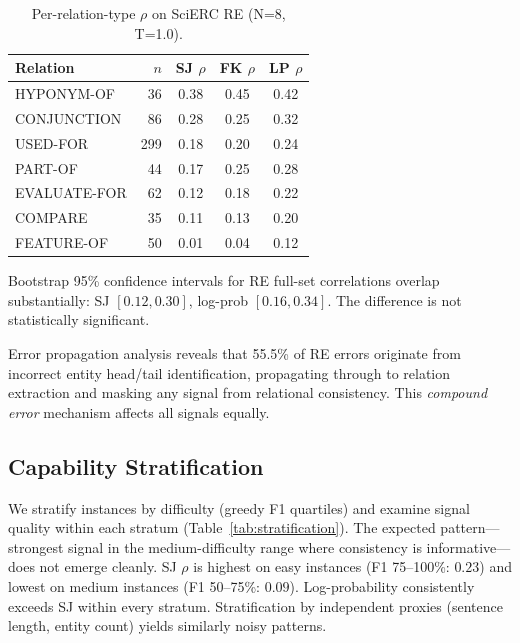 \documentclass[11pt,a4paper]{article}
\begin{document}
\begin{table}[t]
\centering
\small
\caption{Per-relation-type $\rho$ on SciERC RE (N=8, T=1.0).}
\label{tab:re_diagnostic}
\begin{tabular}{lrccc}
\toprule
Relation & $n$ & SJ $\rho$ & FK $\rho$ & LP $\rho$ \\
\midrule
HYPONYM-OF & 36 & 0.38 & 0.45 & 0.42 \\
CONJUNCTION & 86 & 0.28 & 0.25 & 0.32 \\
USED-FOR & 299 & 0.18 & 0.20 & 0.24 \\
PART-OF & 44 & 0.17 & 0.25 & 0.28 \\
EVALUATE-FOR & 62 & 0.12 & 0.18 & 0.22 \\
COMPARE & 35 & 0.11 & 0.13 & 0.20 \\
FEATURE-OF & 50 & 0.01 & 0.04 & 0.12 \\
\bottomrule
\end{tabular}
\end{table}

Bootstrap 95\% confidence intervals for RE full-set correlations overlap substantially: SJ $[0.12, 0.30]$, log-prob $[0.16, 0.34]$. The difference is not statistically significant.

Error propagation analysis reveals that 55.5\% of RE errors originate from incorrect entity head/tail identification, propagating through to relation extraction and masking any signal from relational consistency. This \emph{compound error} mechanism affects all signals equally.

\subsection{Capability Stratification}
\label{sec:stratification}

We stratify instances by difficulty (greedy F1 quartiles) and examine signal quality within each stratum (Table~\ref{tab:stratification}). The expected pattern---strongest signal in the medium-difficulty range where consistency is informative---does not emerge cleanly. SJ $\rho$ is highest on easy instances (F1 75--100\%: $0.23$) and lowest on medium instances (F1 50--75\%: $0.09$). Log-probability consistently exceeds SJ within every stratum. Stratification by independent proxies (sentence length, entity count) yields similarly noisy patterns.
\end{document}

